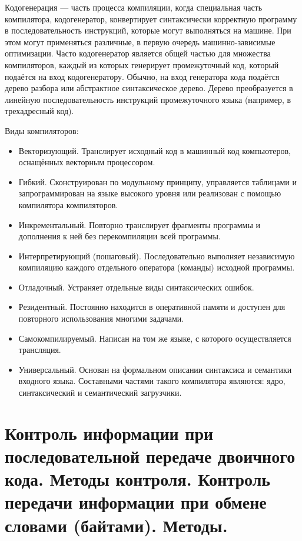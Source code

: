 \documentclass[unicode, 12pt, a4paper, oneside]{article}
\begin{document}
Кодогенерация — часть процесса компиляции, когда специальная часть компилятора, кодогенератор, конвертирует синтаксически корректную программу в последовательность инструкций, которые могут выполняться на машине. При этом могут применяться различные, в первую очередь машинно-зависимые оптимизации. Часто кодогенератор является общей частью для множества компиляторов, каждый из которых генерирует промежуточный код, который подаётся на вход кодогенератору. Обычно, на вход генератора кода подаётся дерево разбора или абстрактное синтаксическое дерево. Дерево преобразуется в линейную последовательность инструкций промежуточного языка (например, в трехадресный код).

Виды компиляторов:

\begin{itemize}
\item Векторизующий. Транслирует исходный код в машинный код компьютеров, оснащённых векторным процессором.
\item Гибкий. Сконструирован по модульному принципу, управляется таблицами и запрограммирован на языке  высокого уровня или реализован с помощью компилятора компиляторов.
\item Инкрементальный. Повторно транслирует фрагменты программы и дополнения к ней без перекомпиляции всей программы.
\item Интерпретирующий (пошаговый). Последовательно выполняет независимую компиляцию каждого отдельного оператора (команды) исходной программы.
\item Отладочный. Устраняет отдельные виды синтаксических ошибок.
\item Резидентный. Постоянно находится в оперативной памяти и доступен для повторного использования многими задачами.
\item Самокомпилируемый. Написан на том же языке, с которого осуществляется трансляция.
\item Универсальный. Основан на формальном описании синтаксиса и семантики входного языка. Составными частями такого компилятора являются: ядро, синтаксический и семантический загрузчики.
\end{itemize}

\section{Контроль информации при последовательной передаче двоичного кода. Методы контроля. Контроль передачи информации при обмене словами (байтами). Методы.}
\end{document}
